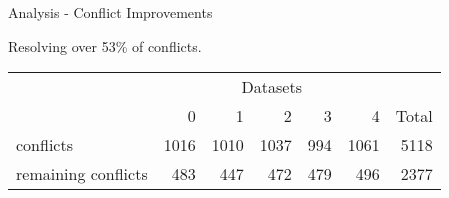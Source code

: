\documentclass{beamer}
\begin{document}
\begin{frame}{Analysis - Conflict Improvements}

Resolving over 53\% of conflicts.

\begin{table}[ht]
\begin{center}
\begin{tabular}[h]{l||r|r|r|r|r||r}
 &  \multicolumn{5}{c}{Datasets} \\
        & 0 & 1 & 2 & 3 & 4 & Total \\
\hline
conflicts & 1016 & 1010	& 1037 & 994 &1061 & 5118 \\
\hline
remaining conflicts & 483 &	447	& 472 &	479	& 496 &	2377

\end{tabular}
\end{center}
\label{tab:conflicts}
\end{table}

  \note{

  }

\end{frame}
\end{document}
